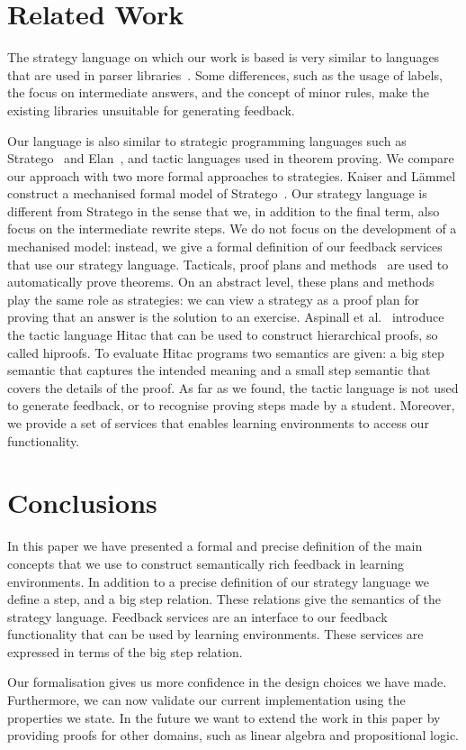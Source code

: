 \documentclass[copyright]{eptcs}
\begin{document}
\section{Related Work}
\label{sec:related}
The strategy language on which our work is based is very similar to languages
that are used in parser libraries~\cite{SwieDupo96}. Some differences, such as
the usage of labels, the focus on intermediate answers, and the concept of minor
rules, make the existing libraries unsuitable for generating feedback.  

Our language is also similar to strategic programming languages such as
Stratego~\cite{VBT98} and Elan~\cite{borovansky01rewriting}, and tactic
languages used in theorem proving. We compare our approach with two more formal
approaches to strategies. Kaiser and L\"ammel construct a mechanised formal
model of Stratego~\cite{kaiser-09}. Our strategy language is different from
Stratego in the sense that we, in addition to the final term, also focus on the
intermediate rewrite steps. We do not focus on the development of a mechanised
model: instead, we give a formal definition of our feedback services that use
our strategy language. Tacticals, proof plans and methods~\cite{bundyproofplans}
are used to automatically prove theorems. On an abstract level, these plans and
methods play the same role as strategies: we can view a strategy as a proof plan
for proving that an answer is the solution to an exercise. Aspinall et
al.~\cite{aspinall} introduce the tactic language Hitac that can be used to
construct hierarchical proofs, so called hiproofs. To evaluate Hitac programs
two semantics are given: a big step semantic that captures the intended meaning
and a small step semantic that covers the details of the proof. As far as we
found, the tactic language is not used to generate feedback, or to recognise
proving steps made by a student. Moreover, we provide a set of services that
enables learning environments to access our functionality.


\section{Conclusions}
\label{sec:conclusions}
In this paper we have presented a formal and precise definition of the main
concepts that we use to construct semantically rich feedback in learning
environments. In addition to a precise definition of our strategy language we
define a step, and a big step relation. These relations give the semantics of
the strategy language. Feedback services are an interface to our feedback
functionality that can be used by learning environments. These services are
expressed in terms of the big step relation.

Our formalisation gives us more confidence in the design choices we have made.
Furthermore, we can now validate our current implementation using the properties
we state. In the future we want to extend the work in this paper by providing
proofs for other domains, such as linear algebra and propositional logic.

\providecommand{\bibfont}{\small}

\label{sec:bib}


\end{document}
